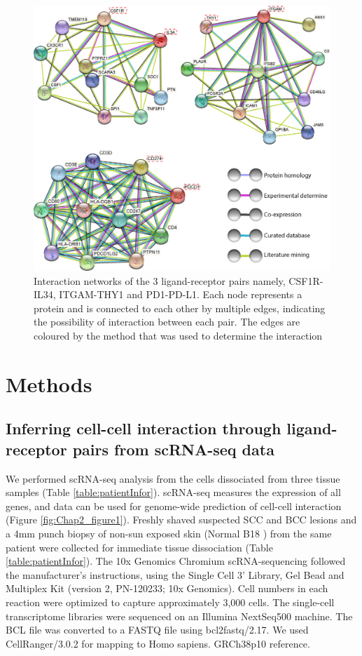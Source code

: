 \begin{figure}[htp]
\renewcommand{\figurename}{Figure}
    \centering
    \includegraphics[width=0.66\columnwidth]{Chapter2/Figures/Supplemental_Fig_S1.png}
    \caption[Interaction networks of the 3 ligand-receptor pairs namely, CSF1R-IL34, ITGAM-THY1 and PD1-PD-L1.]{Interaction networks of the 3 ligand-receptor pairs namely, CSF1R-IL34, ITGAM-THY1 and PD1-PD-L1. Each node represents a protein and is connected to each other by multiple edges, indicating the possibility of interaction between each pair. The edges are coloured by the method that was used to determine the interaction}
    \label{fig:Chap2_Supfigure1}
\end{figure}

\section{Methods}
\label{Sec:Methods}
\subsection{Inferring cell-cell interaction through ligand-receptor pairs from scRNA-seq data}
We performed scRNA-seq analysis from the cells dissociated from three tissue samples (Table \ref{table:patientInfor}). scRNA-seq measures the expression of all genes, and data can be used for genome-wide prediction of cell-cell interaction (Figure \ref{fig:Chap2_figure1}). Freshly shaved suspected SCC and BCC lesions and a 4mm punch biopsy of non-sun exposed skin (Normal B18 ) from the same patient were collected for immediate tissue dissociation (Table \ref{table:patientInfor}). The 10x Genomics Chromium scRNA-sequencing followed the manufacturer’s instructions, using the Single Cell 3’ Library, Gel Bead and Multiplex Kit (version 2, PN-120233; 10x Genomics). Cell numbers in each reaction were optimized to capture approximately 3,000 cells. The single-cell transcriptome libraries were sequenced on an Illumina NextSeq500 machine. The BCL file was converted to a FASTQ file using bcl2fastq/2.17. We used CellRanger/3.0.2 for mapping to Homo sapiens. GRCh38p10 reference. 

